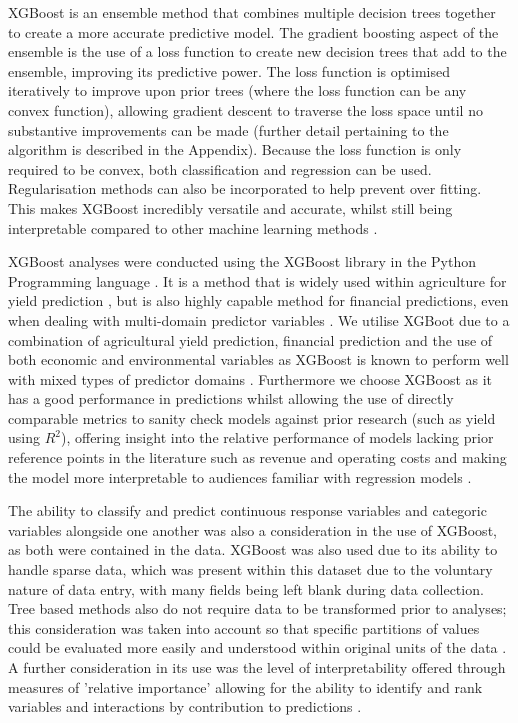 \documentclass[review,12pt,authoryear]{elsarticle}
\begin{document}
\begin{linenumbers}
XGBoost is an ensemble method that combines multiple decision trees together to create a more accurate predictive model. The gradient boosting aspect of the ensemble is the use of a loss function to create new decision trees that add to the ensemble, improving its predictive power. The loss function is optimised iteratively to improve upon prior trees (where the loss function can be any convex function), allowing gradient descent to traverse the loss space until no substantive improvements can be made (further detail pertaining to the algorithm is described in the Appendix). Because the loss function is only required to be convex, both classification and regression can be used. Regularisation methods can also be incorporated to help prevent over fitting. This makes XGBoost incredibly versatile and accurate, whilst still being interpretable compared to other machine learning methods \citep{kistenExplainableArtificialIntelligence2024}.
\par
XGBoost analyses were conducted using the XGBoost library \citep{chenXGBoostScalableTree2016} in the Python Programming language \citep{g.vanrossumPythonTutorialTechnical1995}. It is a method that is widely used within agriculture for yield prediction \citep{d.mariadassExtremeGradientBoosting2022,liGlobalDetrendingSignificantly2024,raviCropYieldPrediction2020}, but is also highly capable method for financial predictions, even when dealing with multi-domain predictor variables \citep{ZHANG2023104045}. We utilise XGBoot due to a combination of agricultural yield prediction, financial prediction and the use of both economic and environmental variables as XGBoost is known to perform well with mixed types of predictor domains \citep{doi:10.1080/15481603.2024.2349341,ZHANG2023104045}. Furthermore we choose XGBoost as it has a good performance in predictions whilst allowing the use of directly comparable metrics to sanity check models against prior research (such as yield using $R^2$), offering insight into the relative performance of models lacking prior reference points in the literature such as revenue and operating costs and making the model more interpretable to audiences familiar with regression models \citep{heFruitYieldPrediction2022,laurentReviewIssuesMethods2021}.
\par
The ability to classify and predict continuous response variables and categoric variables alongside one another was also a consideration in the use of XGBoost, as both were contained in the data. XGBoost was also used due to its ability to handle sparse data, which was present within this dataset due to the voluntary nature of data entry, with many fields being left blank during data collection. Tree based methods also do not require data to be transformed prior to analyses; this consideration was taken into account so that specific partitions of values could be evaluated more easily and understood within original units of the data \citep{d.mariadassExtremeGradientBoosting2022}. A further consideration in its use was the level of interpretability offered through measures of 'relative importance' allowing for the ability to identify and rank variables and interactions by contribution to predictions \citep{chenXGBoostScalableTree2016}.

\end{linenumbers}
\end{document}
